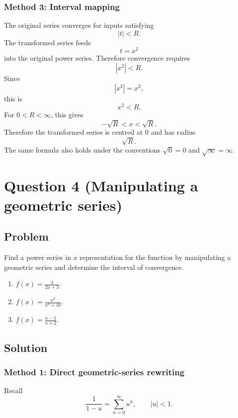 \documentclass[12pt]{article}
\newcommand{\ds}{\displaystyle}
\begin{document}
\newpage
\subsubsection*{Method 3: Interval mapping}
The original series converges for inputs satisfying
\[
|t|<R.
\]
The transformed series feeds
\[
t=x^2
\]
into the original power series. Therefore convergence requires
\[
|x^2|<R.
\]
Since
\[
|x^2|=x^2,
\]
this is
\[
x^2<R.
\]
For \(0<R<\infty\), this gives
\[
-\sqrt R<x<\sqrt R.
\]
Therefore the transformed series is centred at \(0\) and has radius
\[
\boxed{\sqrt R}.
\]
The same formula also holds under the conventions \(\sqrt0=0\) and \(\sqrt{\infty}=\infty\).

\newpage
\section*{Question 4 (Manipulating a geometric series)}
\subsection*{Problem}
Find a power series in \(x\) representation for the function by manipulating a geometric series and determine the interval of convergence.
\begin{enumerate}[label=(\alph*)]
  \item \(f(x)=\ds \frac{4}{2x+3}\).
  \item \(f(x)=\ds \frac{x^2}{x^4+16}\).
  \item \(f(x)=\ds \frac{x-1}{x+2}\).
\end{enumerate}

\subsection*{Solution}

\subsubsection*{Method 1: Direct geometric-series rewriting}
Recall
\[
\frac1{1-u}=\sum_{n=0}^{\infty}u^n,
\qquad |u|<1.
\]
\end{document}
